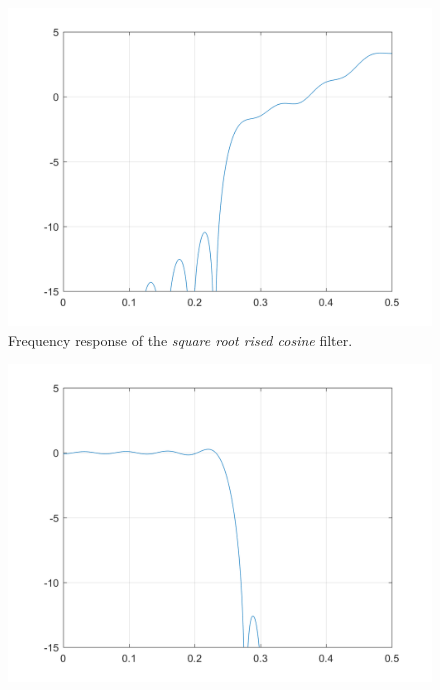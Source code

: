 \documentclass[a4paper, 12pt]{report}
\begin{document}
\begin{figure}[H]
	\centering
	\includegraphics[width=14cm]{Q_r}
	\caption{Frequency response of the \textit{square root rised cosine} filter.}\label{}
\end{figure}

\begin{figure}[H]
	\centering
	\includegraphics[width=14cm]{G_srrc}
	\caption{}\label{}
\end{figure}
\end{document}
